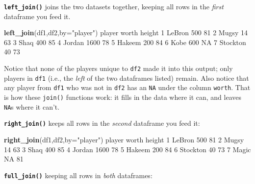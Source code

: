 \documentclass[
]{book}
\newenvironment{Shaded}{\begin{snugshade}}{\end{snugshade}}
\newcommand{\DataTypeTok}[1]{\textcolor[rgb]{0.13,0.29,0.53}{#1}}
\newcommand{\DecValTok}[1]{\textcolor[rgb]{0.00,0.00,0.81}{#1}}
\newcommand{\KeywordTok}[1]{\textcolor[rgb]{0.13,0.29,0.53}{\textbf{#1}}}
\newcommand{\NormalTok}[1]{#1}
\newcommand{\OtherTok}[1]{\textcolor[rgb]{0.56,0.35,0.01}{#1}}
\newcommand{\StringTok}[1]{\textcolor[rgb]{0.31,0.60,0.02}{#1}}
\begin{document}
\textbf{\texttt{left\_join()}} joins the two datasets together, keeping all rows in the \emph{first} dataframe you feed it.

\begin{Shaded}
\begin{Highlighting}[]
\KeywordTok{left_join}\NormalTok{(df1,df2,}\DataTypeTok{by=}\StringTok{"player"}\NormalTok{)}
\NormalTok{    player worth height}
\DecValTok{1}\NormalTok{   LeBron   }\DecValTok{500}     \DecValTok{81}
\DecValTok{2}\NormalTok{    Mugsy    }\DecValTok{14}     \DecValTok{63}
\DecValTok{3}\NormalTok{     Shaq   }\DecValTok{400}     \DecValTok{85}
\DecValTok{4}\NormalTok{   Jordan  }\DecValTok{1600}     \DecValTok{78}
\DecValTok{5}\NormalTok{   Hakeem   }\DecValTok{200}     \DecValTok{84}
\DecValTok{6}\NormalTok{     Kobe   }\DecValTok{600}     \OtherTok{NA}
\DecValTok{7}\NormalTok{ Stockton    }\DecValTok{40}     \DecValTok{73}
\end{Highlighting}
\end{Shaded}

Notice that none of the players unique to \texttt{df2} made it into this output; only players in \texttt{df1} (i.e., the \emph{left} of the two dataframes listed) remain. Also notice that any player from \texttt{df1} who was not in \texttt{df2} has an \texttt{NA} under the column \texttt{worth}. That is how these \texttt{join()} functions work: it fills in the data where it can, and leaves \texttt{NA}s where it can't.

\textbf{\texttt{right\_join()}} keeps all rows in the \emph{second} dataframe you feed it:

\begin{Shaded}
\begin{Highlighting}[]
\KeywordTok{right_join}\NormalTok{(df1,df2,}\DataTypeTok{by=}\StringTok{"player"}\NormalTok{)}
\NormalTok{    player worth height}
\DecValTok{1}\NormalTok{   LeBron   }\DecValTok{500}     \DecValTok{81}
\DecValTok{2}\NormalTok{    Mugsy    }\DecValTok{14}     \DecValTok{63}
\DecValTok{3}\NormalTok{     Shaq   }\DecValTok{400}     \DecValTok{85}
\DecValTok{4}\NormalTok{   Jordan  }\DecValTok{1600}     \DecValTok{78}
\DecValTok{5}\NormalTok{   Hakeem   }\DecValTok{200}     \DecValTok{84}
\DecValTok{6}\NormalTok{ Stockton    }\DecValTok{40}     \DecValTok{73}
\DecValTok{7}\NormalTok{    Magic    }\OtherTok{NA}     \DecValTok{81}
\end{Highlighting}
\end{Shaded}

\textbf{\texttt{full\_join()}} keeping all rows in \emph{both} dataframes:
\end{document}
